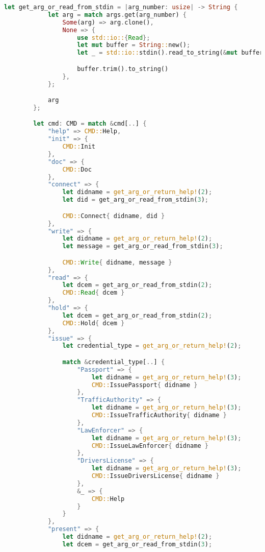 \begin{lstlisting}[language=Rust]
        let get_arg_or_read_from_stdin = |arg_number: usize| -> String {
            let arg = match args.get(arg_number) {
                Some(arg) => arg.clone(),
                None => {
                    use std::io::{Read};
                    let mut buffer = String::new();
                    let _ = std::io::stdin().read_to_string(&mut buffer);

                    buffer.trim().to_string()
                },
            };

            arg
        };

        let cmd: CMD = match &cmd[..] {
            "help" => CMD::Help,
            "init" => {
                CMD::Init
            },
            "doc" => {
                CMD::Doc
            },
            "connect" => {
                let didname = get_arg_or_return_help!(2);
                let did = get_arg_or_read_from_stdin(3);

                CMD::Connect{ didname, did }
            },
            "write" => {
                let didname = get_arg_or_return_help!(2);
                let message = get_arg_or_read_from_stdin(3);

                CMD::Write{ didname, message }
            },
            "read" => {
                let dcem = get_arg_or_read_from_stdin(2);
                CMD::Read{ dcem }
            },
            "hold" => {
                let dcem = get_arg_or_read_from_stdin(2);
                CMD::Hold{ dcem }
            },
            "issue" => {
                let credential_type = get_arg_or_return_help!(2);

                match &credential_type[..] {
                    "Passport" => {
                        let didname = get_arg_or_return_help!(3);
                        CMD::IssuePassport{ didname }
                    },
                    "TrafficAuthority" => {
                        let didname = get_arg_or_return_help!(3);
                        CMD::IssueTrafficAuthority{ didname }
                    },
                    "LawEnforcer" => {
                        let didname = get_arg_or_return_help!(3);
                        CMD::IssueLawEnforcer{ didname }
                    },
                    "DriversLicense" => {
                        let didname = get_arg_or_return_help!(3);
                        CMD::IssueDriversLicense{ didname }
                    },
                    &_ => {
                        CMD::Help
                    }
                }
            },
            "present" => {
                let didname = get_arg_or_return_help!(2);
                let dcem = get_arg_or_read_from_stdin(3);


\end{lstlisting}
